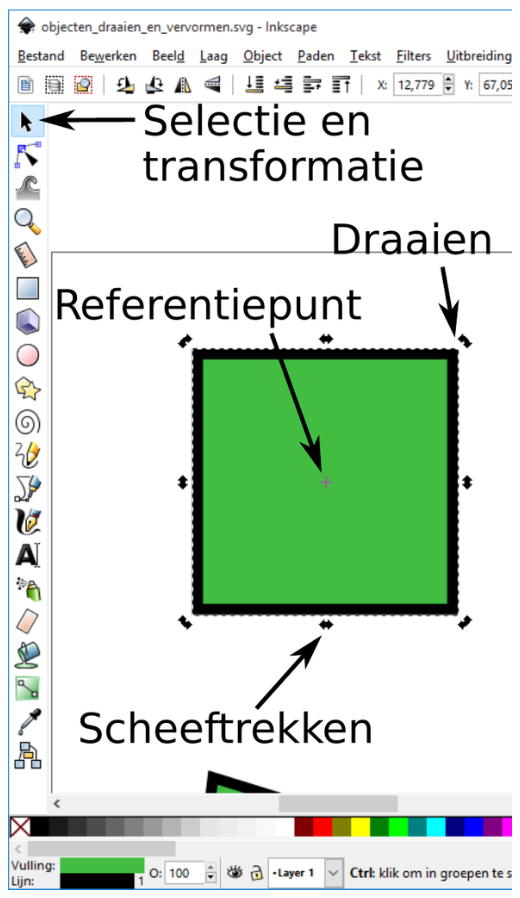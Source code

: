 \documentclass[t]{beamer}
\begin{document}
\begin{frame}
{\begin{columns}
\begin{column}[T]{0.4\textwidth}
					\includegraphics[height=0.8\textheight]{fig/inkscape_objecten_draaien_en_transformeren}
				\end{column}
			\end{columns}
		}
\end{frame}
\end{document}
